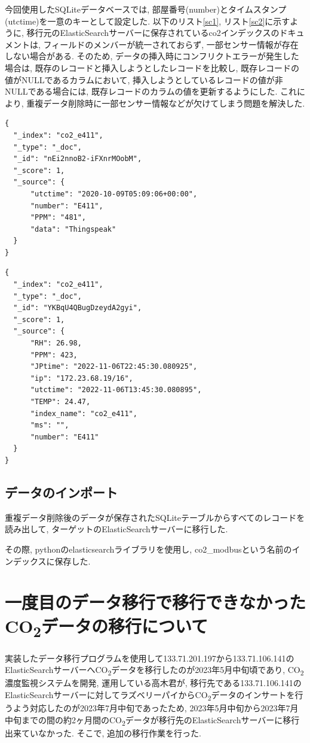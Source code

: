 今回使用したSQLiteデータベースでは, 部屋番号(number)とタイムスタンプ(utctime)を一意のキーとして設定した. 以下のリスト\ref{sc1}, リスト\ref{sc2}に示すように, 移行元のElasticSearchサーバーに保存されているco2インデックスのドキュメントは, フィールドのメンバーが統一されておらず, 一部センサー情報が存在しない場合がある. そのため, データの挿入時にコンフリクトエラーが発生した場合は, 既存のレコードと挿入しようとしたレコードを比較し, 既存レコードの値がNULLであるカラムにおいて, 挿入しようとしているレコードの値が非NULLである場合には, 既存レコードのカラムの値を更新するようにした. これにより, 重複データ削除時に一部センサー情報などが欠けてしまう問題を解決した.

\begin{lstlisting}[caption=\_sourceフィールドのメンバー数が少ないドキュメント, label=sc1]
{
  "_index": "co2_e411",
  "_type": "_doc",
  "_id": "nEi2nnoB2-iFXnrMOobM",
  "_score": 1,
  "_source": {
      "utctime": "2020-10-09T05:09:06+00:00",
      "number": "E411",
      "PPM": "481",
      "data": "Thingspeak"
  }
}
  \end{lstlisting}

\begin{lstlisting}[caption=\_sourceフィールドのメンバー数が多いドキュメント, label=sc2]
{
  "_index": "co2_e411",
  "_type": "_doc",
  "_id": "YKBqU4QBugDzeydA2gyi",
  "_score": 1,
  "_source": {
      "RH": 26.98,
      "PPM": 423,
      "JPtime": "2022-11-06T22:45:30.080925",
      "ip": "172.23.68.19/16",
      "utctime": "2022-11-06T13:45:30.080895",
      "TEMP": 24.47,
      "index_name": "co2_e411",
      "ms": "",
      "number": "E411"
  }
}
    \end{lstlisting}

\subsection{データのインポート}
重複データ削除後のデータが保存されたSQLiteテーブルからすべてのレコードを読み出して, ターゲットのElasticSearchサーバーに移行した.

その際, pythonのelasticsearchライブラリを使用し, co2\_modbusという名前のインデックスに保存した.

\section{一度目のデータ移行で移行できなかったCO\textsubscript{2}データの移行について}

実装したデータ移行プログラムを使用して133.71.201.197から133.71.106.141のElasticSearchサーバーへCO\textsubscript{2}データを移行したのが2023年5月中旬頃であり, CO\textsubscript{2}濃度監視システムを開発, 運用している高木君が, 移行先である133.71.106.141のElasticSearchサーバーに対してラズベリーパイからCO\textsubscript{2}データのインサートを行うよう対応したのが2023年7月中旬であったため, 2023年5月中旬から2023年7月中旬までの間の約2ヶ月間のCO\textsubscript{2}データが移行先のElasticSearchサーバーに移行出来ていなかった. そこで, 追加の移行作業を行った.

